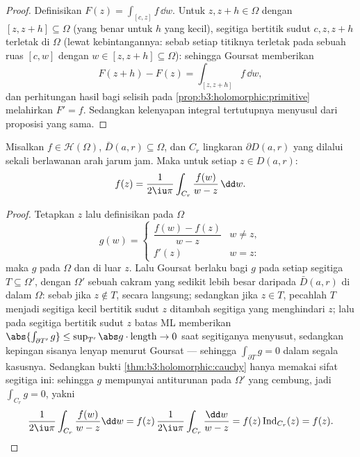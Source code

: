 \begin{proof}
Definisikan $F(z) = \int_{[c,z]}f\,\dd w$. Untuk $z, z + h \in
\Omega$ dengan $[z, z+h] \subseteq \Omega$ (yang benar untuk $h$ yang kecil),
segitiga bertitik sudut $c, z, z+h$ terletak di $\Omega$
(lewat kebintangannya: sebab setiap titiknya terletak pada sebuah ruas $[c,
w]$ dengan $w \in [z, z+h] \subseteq \Omega$): sehingga Goursat memberikan
\[
F(z + h) - F(z) = \int_{[z, z+h]}f\,\dd w,
\]
dan perhitungan hasil bagi selisih pada
\cref{prop:b3:holomorphic:primitive} melahirkan $F' = f$. Sedangkan
kelenyapan integral  tertutupnya menyusul dari proposisi
yang sama.
\end{proof}

\begin{theorem}
\label{thm:b3:holomorphic:formula}
Misalkan $f \in \mathcal H(\Omega)$, $\bar D(a, r) \subseteq
\Omega$, dan $C_r$ lingkaran $\partial D(a,r)$ yang dilalui sekali
berlawanan arah jarum jam. Maka untuk setiap $z \in D(a, r)$:
\[
f(z) = \frac1{2\iu\pi}\int_{C_r}\frac{f(w)}{w - z}\,\dd w .
\]
\end{theorem}

\begin{proof}
Tetapkan $z$ lalu definisikan pada $\Omega$
\[
g(w) = \begin{cases}
\dfrac{f(w) - f(z)}{w - z} & w \neq z,\\[4pt]
f'(z) & w = z :
\end{cases}
\]
maka $g$  pada $\Omega$ dan  di luar $z$. Lalu Goursat
berlaku bagi $g$ pada setiap segitiga $T \subseteq \Omega'$, dengan
$\Omega'$ sebuah cakram yang sedikit lebih besar daripada $\bar D(a,r)$ di dalam
$\Omega$: sebab jika $z \notin T$, secara langsung; sedangkan jika $z \in T$, pecahlah $T$
menjadi segitiga kecil bertitik sudut $z$ ditambah segitiga
yang menghindari $z$; lalu pada segitiga bertitik sudut $z$ batas ML memberikan
$\abs{\int_{\partial T'}g} \leq \sup_{T'}\abs
g\cdot\operatorname{length} \to 0$ saat segitiganya menyusut,
sedangkan kepingan sisanya lenyap menurut Goursat --- sehingga
$\int_{\partial T}g = 0$ dalam segala kasusnya. Sedangkan bukti
\cref{thm:b3:holomorphic:cauchy} hanya memakai sifat segitiga ini:
sehingga $g$ mempunyai antiturunan pada $\Omega'$ yang cembung, jadi
$\int_{C_r}g = 0$, yakni
\[
\frac1{2\iu\pi}\int_{C_r}\frac{f(w)}{w - z}\dd w
= f(z)\,\frac{1}{2\iu\pi}\int_{C_r}\frac{\dd w}{w - z}
= f(z)\operatorname{Ind}_{C_r}(z) = f(z) .
\]
\end{proof}

